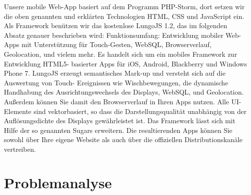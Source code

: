 \begin{itemize}
	Unsere mobile Web-App basiert auf dem Programm PHP-Storm, dort setzen wir die oben genannten und erklärten Technologien HTML, CSS und JavaScript ein. Als Framework benützen wir das kostenlose LungoJS 1.2, das im folgenden Absatz genauer beschrieben wird:
	Funktionsumfang: Entwicklung mobiler Web-Apps mit Unterstützung für Touch-Gesten, WebSQL, Browserverlauf, Geolocation, und vielem mehr.
	Es handelt sich um ein mobiles Framework zur Entwicklung HTML5- basierter Apps für iOS, Android, Blackberry und Windows Phone 7. LungoJS erzeugt semantisches Mark-up und versteht sich auf die Auswertung von Touch- Ereignissen wie Wischbewegungen, die dynamische Handhabung des Ausrichtungswechsels des Displays, WebSQL, und Geolocation. Außerdem können Sie damit den Browserverlauf in Ihren Apps nutzen.
	Alle UI-Elemente sind vektorbasiert, so dass die Darstellungsqualität unabhängig von der Auflösungsdichte des Displays gewährleistet ist. Das Framework lässt sich mit Hilfe der so genannten Sugars erweitern. Die resultierenden Apps können Sie sowohl über Ihre eigene Website als auch über die offiziellen Distributionskanäle vertreiben.
	
\end{itemize}
\chapter{Problemanalyse}
